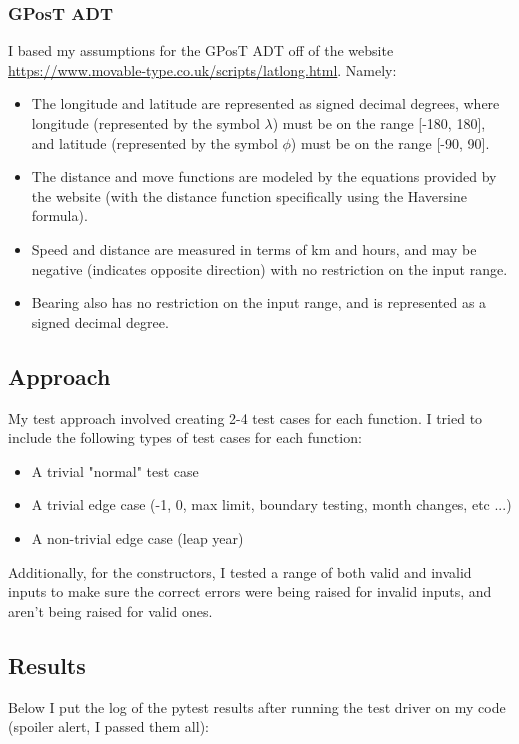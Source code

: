 \documentclass[12pt]{article}
\begin{document}
\subsubsection{GPosT ADT}
I based my assumptions for the GPosT ADT off of the website \url{https://www.movable-type.co.uk/scripts/latlong.html}. Namely:
\begin{itemize}
  \item The longitude and latitude are represented as signed decimal degrees, where longitude (represented by the symbol $\lambda$) must be on the range [-180, 180], and latitude (represented by the symbol $\phi$) must be on the range [-90, 90].
  \item The distance and move functions are modeled by the equations provided by the website (with the distance function specifically using the Haversine formula).
  \item Speed and distance are measured in terms of km and hours, and may be negative (indicates opposite direction) with no restriction on the input range.
  \item Bearing also has no restriction on the input range, and is represented as a signed decimal degree.
\end{itemize} 

\subsection{Approach}
My test approach involved creating 2-4 test cases for each function. I tried to include the following types of test cases for each function:
\begin{itemize}
  \item A trivial "normal" test case
  \item A trivial edge case (-1, 0, max limit, boundary testing, month changes, etc ...)
  \item A non-trivial edge case (leap year)
\end{itemize}

Additionally, for the constructors, I tested a range of both valid and invalid inputs to make sure the correct errors were being raised for invalid inputs, and aren't being raised for valid ones.

\subsection{Results}
Below I put the log of the pytest results after running the test driver on my code (spoiler alert, I passed them all):
\end{document}
